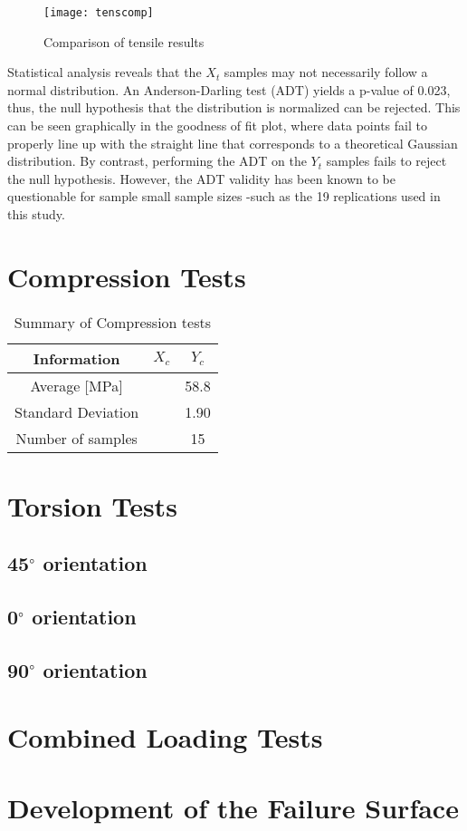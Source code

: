 \documentclass[main.tex]{subfiles}
\begin{document}
\begin{figure}[h]
	\center
	\texttt{[image: tenscomp]}
	\caption{Comparison of tensile results} \label{fig:tensComp}
\end{figure}

Statistical analysis reveals that the $X_t$ samples may not necessarily follow a normal distribution. An Anderson-Darling test (ADT) yields a p-value of 0.023, thus, the null hypothesis that the distribution is normalized can be rejected. This can be seen graphically in the goodness of fit plot, where data points fail to properly line up with the straight line that corresponds to a theoretical Gaussian distribution. By contrast, performing the ADT on the $Y_t$ samples fails to reject the null hypothesis. However, the ADT validity has been known to be questionable for sample small sample sizes -such as the 19 replications used in this study.      
\section{Compression Tests} \label{sec:compr}
\begin{table} [h]
	\centering
	\caption{Summary of Compression tests}
	\begin{tabular}{ c| c c } 
		\toprule
		\textbf{Information} & $X_c$ & $Y_c$\\
		\midrule
		Average [MPa] &  & 58.8\\
		Standard Deviation &  & 1.90\\
		Number of samples &  & 15\\
		\bottomrule
	\end{tabular}
\label{tab:comprtab}
\end{table}

\section{Torsion Tests} \label{sec:torsr}
\subsection{45$^\circ$ orientation} \label{ssec:45r}
\subsection{0$^\circ$ orientation} \label{ssec:0r}
\subsection{90$^\circ$ orientation} \label{ssec:90r}
\section{Combined Loading Tests} \label{sec:clr}
\section{Development of the Failure Surface} \label{sec:fsc}

% 

\end{document}

